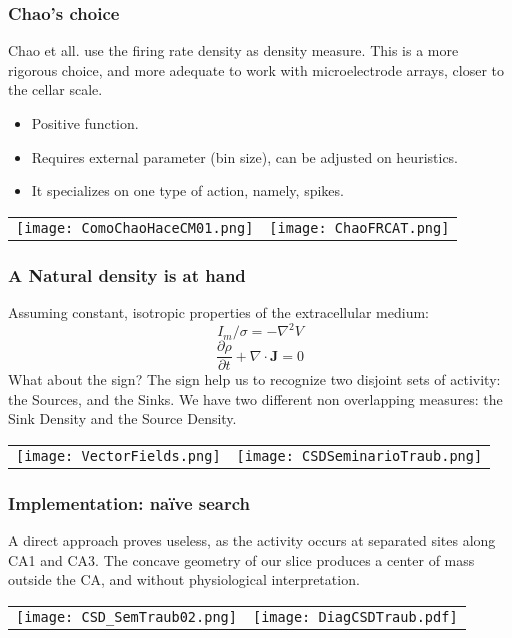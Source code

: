 \documentclass[10pt, serif]{beamer}
\begin{document}
   \begin{frame}
     \frametitle{Chao's choice}

     Chao et all. use the firing rate density as density measure. 
     This is a more rigorous choice, and more adequate to
     work with microelectrode arrays, closer to the cellar scale.
          
     \begin{itemize}
       \item Positive function.
       \item Requires external parameter (bin size), can be adjusted on
         heuristics. 
       \item It specializes on one type of action, namely, spikes. 
     \end{itemize}

     \begin{tabular}{ c c }
      \texttt{[image: ComoChaoHaceCM01.png]} &
       \texttt{[image: ChaoFRCAT.png]} 
     \end{tabular}

    \end{frame}

   

  \begin{frame}
    \frametitle{A Natural density is at hand}
    Assuming constant, isotropic properties of the extracellular medium:
      \begin{equation}
       I_m/\sigma=-\nabla^2 V
      \end{equation}
      \begin{equation}
       \frac{\partial \rho}{\partial t} + \nabla \cdot \mathbf{J}=0 
      \end{equation}
      What about the sign?
      The sign help us to recognize two disjoint sets of activity:
      the Sources, and the Sinks.
      We have two different non overlapping measures: the
      Sink Density and the Source Density.\\

      \begin{tabular}{ c c }
        \texttt{[image: VectorFields.png]} &
        \texttt{[image: CSDSeminarioTraub.png]} 
      \end{tabular}
          
  \end{frame}
     
     

  \begin{frame}
     \frametitle{Implementation: naïve search}
     A direct approach proves useless, as the activity occurs at separated
     sites along CA1 and CA3. The concave geometry of our slice
     produces a center of mass outside the CA, and without physiological
     interpretation.

       \begin{tabular}{ c c }
      \texttt{[image: CSD\_SemTraub02.png]} &
       \texttt{[image: DiagCSDTraub.pdf]} 
     \end{tabular}
     
  \end{frame}
\end{document}

